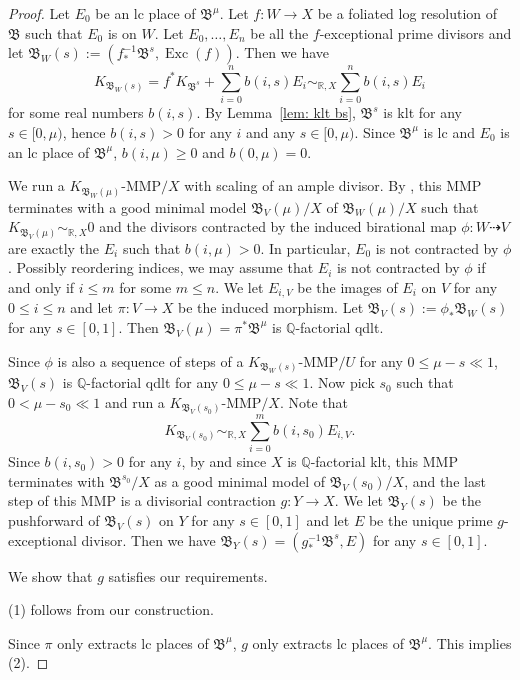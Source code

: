 \documentclass[11pt,reqno]{amsart}
\numberwithin{equation}{section}
\newcommand{\Exc}{\operatorname{Exc}}
\newcommand{\Bb}{{\mathfrak{B}}}
\theoremstyle{definition}
\begin{document}
\begin{proof}
Let $E_0$ be an lc place of $\Bb^{\mu}$. Let $f: W\rightarrow X$ be a foliated log resolution of $\Bb$ such that $E_0$ is on $W$. Let $E_0,\dots,E_n$ be all the $f$-exceptional prime divisors and let $\Bb_W(s):=(f^{-1}_*\Bb^s,\Exc(f))$. Then we have
$$K_{\Bb_W(s)}=f^*K_{\Bb^s}+\sum_{i=0}^nb(i,s)E_i\sim_{\mathbb R,X}\sum_{i=0}^nb(i,s)E_i$$
for some real numbers $b(i,s)$. By Lemma~\ref{lem: klt bs}, $\Bb^s$ is klt for any $s\in [0,\mu)$, hence $b(i,s)>0$ for any $i$ and any $s\in [0,\mu)$. Since $\Bb^\mu$ is lc and $E_0$ is an lc place of $\Bb^{\mu}$,
$b(i,\mu)\geq 0$ and $b(0,\mu)=0$. 

We run a $K_{\Bb_W(\mu)}$-MMP$/X$ with scaling of an ample divisor. By \cite[Theorem~3.6]{Cas+25b}, this MMP terminates with a good minimal model $\Bb_V(\mu)/X$ of $\Bb_W(\mu)/X$ such that $K_{\Bb_V(\mu)}\sim_{\mathbb R,X}0$ and the divisors contracted by the induced birational map $\phi\colon W\dashrightarrow V$ are exactly the $E_i$ such that $b(i,\mu)>0$. In particular, $E_0$ is not contracted by $\phi$. Possibly reordering indices, we may assume that $E_i$ is not contracted by $\phi$ if and only if $i\leq m$ for some $m\leq n$. We let $E_{i,V}$ be the images of $E_i$ on $V$ for any $0\leq i\leq n$ and let $\pi: V\rightarrow X$ be the induced morphism. Let $\Bb_V(s):=\phi_*\Bb_W(s)$ for any $s\in [0,1]$. Then $\Bb_V(\mu)=\pi^*\Bb^{\mu}$ is $\mathbb Q$-factorial qdlt. 

Since $\phi$ is also a sequence of steps of a $K_{\Bb_W(s)}$-MMP$/U$ for any $0\leq \mu-s\ll 1$, $\Bb_V(s)$ is $\mathbb Q$-factorial qdlt for any $0\leq \mu-s\ll 1$. Now pick $s_0$ such that $0<\mu-s_0\ll 1$ and run a $K_{\Bb_V(s_0)}$-MMP$/X$. Note that
$$K_{\Bb_V(s_0)}\sim_{\mathbb R,X}\sum_{i=0}^mb(i,s_0)E_{i,V}.$$
Since $b(i,s_0)>0$ for any $i$, by \cite[Theorem~3.6]{Cas+25b} and since $X$ is $\mathbb Q$-factorial klt, this MMP terminates with $\Bb^{s_0}/X$ as a good minimal model of $\Bb_V(s_0)/X$, and the last step of this MMP is a divisorial contraction $g: Y\rightarrow X$. We let $\Bb_Y(s)$ be the pushforward of $\Bb_V(s)$ on $Y$ for any $s\in [0,1]$ and let $E$ be the unique prime $g$-exceptional divisor. Then we have $\Bb_Y(s)=(g^{-1}_*\Bb^s,E)$ for any $s\in [0,1]$.

We show that $g$ satisfies our requirements. 

(1) follows from our construction. 

Since $\pi$ only extracts lc places of $\Bb^{\mu}$, $g$ only extracts lc places of $\Bb^{\mu}$. This implies (2).


\end{proof}
\end{document}
